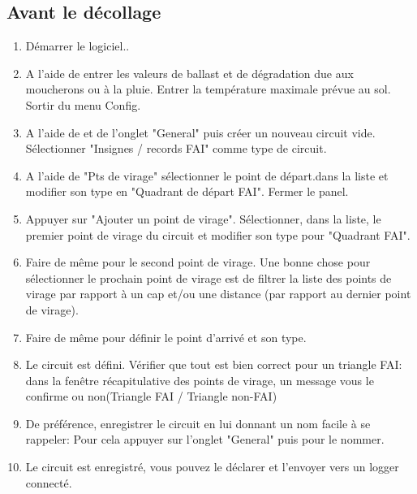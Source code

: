 \subsection*{Avant le décollage}
\begin{enumerate}
\item  Démarrer le logiciel..
\item  A l'aide de \blink{}entrer les valeurs de ballast et de dégradation due aux moucherons ou à la pluie. Entrer la température maximale prévue au sol. Sortir du menu Config.
\item  A l'aide de \blink{}et de l'onglet "General" puis créer un nouveau circuit vide. Sélectionner "Insignes / records FAI"  comme type de circuit.
\item A l'aide de "Pts de virage" sélectionner le point de départ.dans la liste et modifier son type en "Quadrant de départ FAI". Fermer le panel.
\item Appuyer sur "Ajouter un point de virage". Sélectionner, dans la liste, le premier point de virage du circuit et modifier son type pour "Quadrant FAI".
\item Faire de même pour le second point de virage. Une bonne chose pour sélectionner le prochain point de virage est de filtrer la liste des points de virage par rapport à un cap et/ou une distance (par rapport au dernier point de virage).
\item  Faire de même pour définir le point d'arrivé et son type.
\item Le circuit est défini. Vérifier que tout est bien correct pour un triangle FAI: dans la fenêtre récapitulative des points de virage, un message vous le confirme ou non(Triangle FAI / Triangle non-FAI)
\item De préférence, enregistrer le circuit en lui donnant un nom facile à se rappeler: Pour cela appuyer sur l'onglet "General" puis pour le nommer.
\item Le circuit est enregistré, vous pouvez le déclarer et l'envoyer vers un logger connecté.
\end{enumerate}

